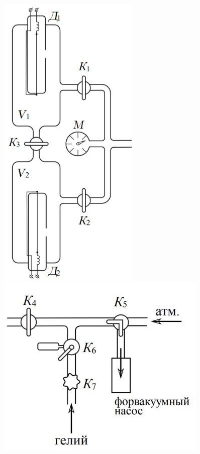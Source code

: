 \documentclass[a4paper,12pt]{article}
\begin{document}
        \begin{figure}[h!]
            \centering
            \begin{minipage}[t]{0.45\textwidth}
                \centering
                \includegraphics[width=0.6\textwidth]{ust.png}
                \caption{}
                \label{fig:setup}
            \end{minipage}
            \hfill
            \begin{minipage}[t]{0.45\textwidth}
                \centering
                \includegraphics[width=0.9\textwidth]{nasos.png}
                \caption{}
                \label{fig:pump}
            \end{minipage}
        \end{figure}
\end{document}

